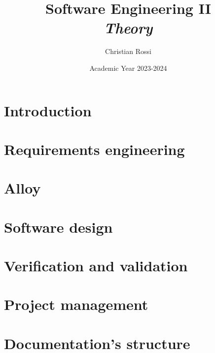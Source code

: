 \documentclass[12pt, a4paper]{report}
\title{Software Engineering II \\ \textit{Theory}}
\author{Christian Rossi}
\date{Academic Year 2023-2024}
\begin{document}
    \maketitle

    

    \cleardoublepage
    
    \tableofcontents

    \cleardoublepage

    \chapter{Introduction}
    
    
    
       

    \chapter{Requirements engineering}
    
    
    
      
    
    
    
     
     

    \chapter{Alloy}
    
    
    
    

    \chapter{Software design}
    
    
    
    
    
    

    \chapter{Verification and validation}
    
    
    

    \chapter{Project management}



    \chapter{Documentation's structure}
    
    
    
\end{document}
